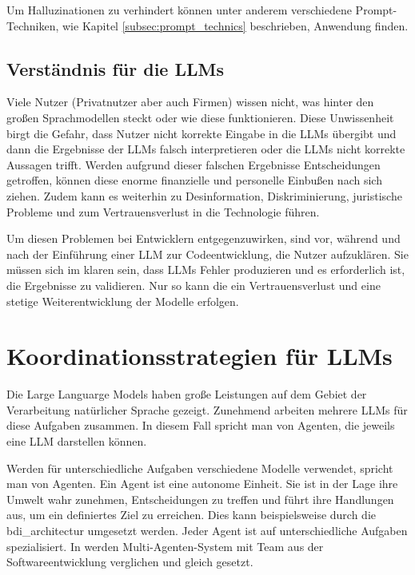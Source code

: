 Um Halluzinationen zu verhindert können unter anderem verschiedene Prompt-Techniken, wie Kapitel \ref{subsec:prompt_technics} beschrieben, Anwendung finden.


\subsection{Verständnis für die LLMs}
Viele Nutzer (Privatnutzer aber auch Firmen) wissen nicht, was hinter den großen Sprachmodellen steckt oder wie diese funktionieren. Diese Unwissenheit birgt die Gefahr, dass Nutzer nicht korrekte Eingabe in die LLMs übergibt und dann die Ergebnisse der LLMs falsch interpretieren oder die LLMs nicht korrekte Aussagen trifft. Werden aufgrund dieser falschen Ergebnisse Entscheidungen getroffen, können diese enorme finanzielle und personelle Einbußen nach sich ziehen. Zudem kann es weiterhin zu Desinformation, Diskriminierung, juristische Probleme und zum Vertrauensverlust in die Technologie führen.\vspace{0.2cm}

Um diesen Problemen bei Entwicklern entgegenzuwirken, sind vor, während und nach der Einführung einer LLM zur Codeentwicklung, die Nutzer aufzuklären. Sie müssen sich im klaren sein, dass LLMs Fehler produzieren und es erforderlich ist, die Ergebnisse zu validieren. Nur so kann die ein Vertrauensverlust und eine stetige Weiterentwicklung der Modelle erfolgen.


\section{Koordinationsstrategien für LLMs}
Die Large Languarge Models haben große Leistungen auf dem Gebiet der Verarbeitung natürlicher Sprache gezeigt. Zunehmend arbeiten mehrere LLMs für diese Aufgaben zusammen. In diesem Fall spricht man von Agenten, die jeweils eine LLM darstellen können.\vspace{0.2cm}

Werden für unterschiedliche Aufgaben verschiedene Modelle verwendet, spricht man von Agenten. Ein Agent ist eine autonome Einheit. Sie ist in der Lage ihre Umwelt wahr zunehmen, Entscheidungen zu treffen und führt ihre Handlungen aus, um ein definiertes Ziel zu erreichen. Dies kann beispielsweise durch die \gls{bdi_architectur} umgesetzt werden. Jeder Agent ist auf unterschiedliche Aufgaben spezialisiert. In \cite{du-2024} werden Multi-Agenten-System mit Team aus der Softwareentwicklung verglichen und gleich gesetzt.\vspace{0.2cm}

